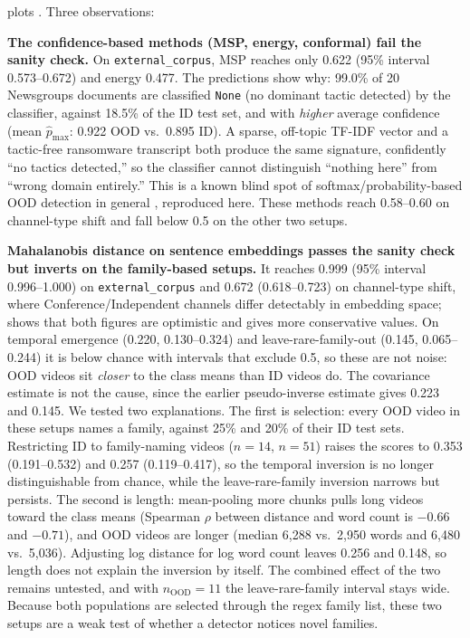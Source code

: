 \documentclass[preprint,12pt]{elsarticle}
\begin{document}
 plots . Three observations:

\textbf{The confidence-based methods (MSP, energy, conformal) fail the
sanity check.} On \texttt{external\_corpus}, MSP reaches only 0.622
(95\% interval 0.573--0.672) and energy 0.477. The predictions show why:
99.0\% of 20 Newsgroups documents are classified
\texttt{None} (no dominant tactic detected) by the classifier, against
18.5\% of the ID test set, and with \emph{higher} average confidence
(mean $\hat p_{\max}$: 0.922 OOD vs.\ 0.895 ID). A sparse, off-topic
TF-IDF vector and a tactic-free ransomware transcript both produce the
same signature, confidently ``no tactics detected,'' so the classifier
cannot distinguish ``nothing here'' from ``wrong domain entirely.'' This
is a known blind spot of softmax/probability-based OOD detection in
general \citep{hendrycks2017baseline}, reproduced here. These
methods reach 0.58--0.60 on channel-type shift and fall below 0.5 on the
other two setups.

\textbf{Mahalanobis distance on sentence embeddings passes the sanity
check but inverts on the family-based setups.} It reaches 0.999 (95\%
interval 0.996--1.000) on \texttt{external\_corpus} and 0.672
(0.618--0.723) on channel-type shift, where Conference/Independent
channels differ detectably in embedding space;  shows
that both figures are optimistic and gives more conservative values. On temporal emergence
(0.220, 0.130--0.324) and leave-rare-family-out (0.145, 0.065--0.244) it
is below chance with intervals that exclude 0.5, so these are not noise:
OOD videos sit \emph{closer} to the class means than ID videos do. The
covariance estimate is not the cause, since the earlier pseudo-inverse
estimate gives 0.223 and 0.145. We tested two explanations. The first is
selection: every OOD video in these setups names a family, against 25\%
and 20\% of their ID test sets. Restricting ID to family-naming videos
($n{=}14$, $n{=}51$) raises the scores to 0.353 (0.191--0.532) and 0.257
(0.119--0.417), so the temporal inversion is no longer distinguishable
from chance, while the leave-rare-family inversion narrows but persists.
The second is length: mean-pooling more chunks pulls long videos toward
the class means (Spearman $\rho$ between distance and word count is
$-0.66$ and $-0.71$), and OOD videos are longer (median 6{,}288 vs.\
2{,}950 words and 6{,}480 vs.\ 5{,}036). Adjusting log distance for log
word count leaves 0.256 and 0.148, so length does not explain the
inversion by itself. The combined effect of the two remains untested, and
with $n_{\mathrm{OOD}}{=}11$ the leave-rare-family interval stays wide.
Because both populations are selected through the regex family list,
these two setups are a weak test of whether a detector notices novel
families.
\end{document}
